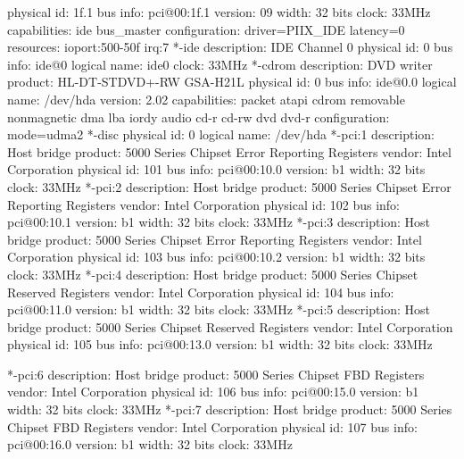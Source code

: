 \documentclass[mingoth,a4paper]{jsarticle}
\begin{document}
{{{{{{\begin{commandline}
             physical id: 1f.1
             bus info: pci@00:1f.1
             version: 09
             width: 32 bits
             clock: 33MHz
             capabilities: ide bus_master
             configuration: driver=PIIX_IDE latency=0
             resources: ioport:500-50f irq:7
           *-ide
                description: IDE Channel 0
                physical id: 0
                bus info: ide@0
                logical name: ide0
                clock: 33MHz
              *-cdrom
                   description: DVD writer
                   product: HL-DT-STDVD+-RW GSA-H21L
                   physical id: 0
                   bus info: ide@0.0
                   logical name: /dev/hda
                   version: 2.02
                   capabilities: packet atapi cdrom removable nonmagnetic dma lba iordy audio cd-r cd-rw dvd dvd-r
                   configuration: mode=udma2
                 *-disc
                      physical id: 0
                      logical name: /dev/hda
     *-pci:1
          description: Host bridge
          product: 5000 Series Chipset Error Reporting Registers
          vendor: Intel Corporation
          physical id: 101
          bus info: pci@00:10.0
          version: b1
          width: 32 bits
          clock: 33MHz
     *-pci:2
          description: Host bridge
          product: 5000 Series Chipset Error Reporting Registers
          vendor: Intel Corporation
          physical id: 102
          bus info: pci@00:10.1
          version: b1
          width: 32 bits
          clock: 33MHz
     *-pci:3
          description: Host bridge
          product: 5000 Series Chipset Error Reporting Registers
          vendor: Intel Corporation
          physical id: 103
          bus info: pci@00:10.2
          version: b1
          width: 32 bits
          clock: 33MHz
     *-pci:4
          description: Host bridge
          product: 5000 Series Chipset Reserved Registers
          vendor: Intel Corporation
          physical id: 104
          bus info: pci@00:11.0
          version: b1
          width: 32 bits
          clock: 33MHz
     *-pci:5
          description: Host bridge
          product: 5000 Series Chipset Reserved Registers
          vendor: Intel Corporation
          physical id: 105
          bus info: pci@00:13.0
          version: b1
          width: 32 bits
          clock: 33MHz
\end{commandline}
\begin{commandline}
     *-pci:6
          description: Host bridge
          product: 5000 Series Chipset FBD Registers
          vendor: Intel Corporation
          physical id: 106
          bus info: pci@00:15.0
          version: b1
          width: 32 bits
          clock: 33MHz
     *-pci:7
          description: Host bridge
          product: 5000 Series Chipset FBD Registers
          vendor: Intel Corporation
          physical id: 107
          bus info: pci@00:16.0
          version: b1
          width: 32 bits
          clock: 33MHz
\end{commandline}

}}}}}}
\end{document}
